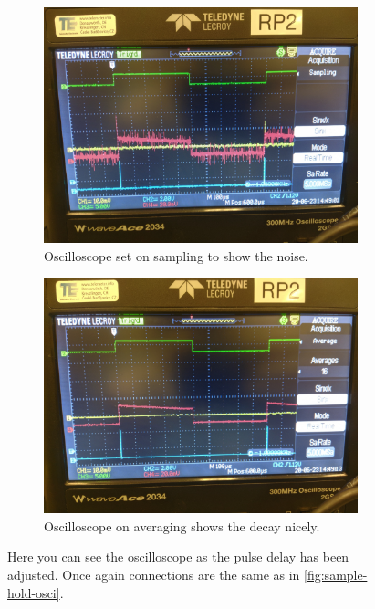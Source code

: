 \documentclass[a4paper, 10pt]{article}
\begin{document}
\begin{figure}[H]
    \centering
    \begin{subfigure}{0.45\textwidth}
        \includegraphics[width=\textwidth]{../images/config-width-sampling.jpg}
        \caption{Oscilloscope set on sampling to show the noise.}
        \label{fig:config-width-sampling}
    \end{subfigure}
    \begin{subfigure}{0.45\textwidth}
        \includegraphics[width=\textwidth]{../images/config-width-averaging.jpg}
        \caption{Oscilloscope on averaging shows the decay nicely.}
        \label{fig:config-width-averaging}
    \end{subfigure}
    \caption{Here you can see the oscilloscope as the pulse delay has been adjusted. Once again connections are the same as in \cref{fig:sample-hold-osci}.}
    \label{fig:config-width}
\end{figure}
\end{document}
